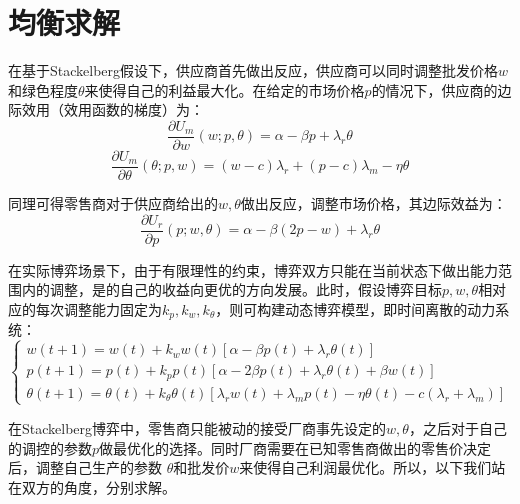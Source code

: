 \documentclass{article}
\begin{document}
\section{均衡求解}
\par 在基于Stackelberg假设下，供应商首先做出反应，供应商可以同时调整批发价格$w$和绿色程度$\theta$来使得自己的利益最大化。在给定的市场价格$p$的情况下，供应商的边际效用（效用函数的梯度）为：
\begin{equation}
    \frac{\partial U_m}{\partial w}(w;p,\theta)=\alpha-\beta p+\lambda_r\theta
\end{equation}
\begin{equation}
    \frac{\partial U_m}{\partial \theta}(\theta;p,w)=(w-c)\lambda_r+(p-c)\lambda_m-\eta\theta
\end{equation}
\par 同理可得零售商对于供应商给出的$w,\theta$做出反应，调整市场价格，其边际效益为：
\begin{equation}
    \frac{\partial U_r}{\partial p}(p;w,\theta)=\alpha-\beta (2p-w)+\lambda_r\theta
\end{equation}
\par 在实际博弈场景下，由于有限理性的约束，博弈双方只能在当前状态下做出能力范围内的调整，是的自己的收益向更优的方向发展。此时，假设博弈目标$p, w, \theta$相对应的每次调整能力固定为$k_p, k_w, k_\theta$，则可构建动态博弈模型，即时间离散的动力系统：
\begin{equation}  
    \left\{  
        \begin{array}{lr}
            w(t+1)=w(t)+k_ww(t)[\alpha-\beta p(t)+\lambda_r\theta(t)]               \\  
            p(t+1)=p(t)+k_pp(t)[\alpha-2\beta p(t)+\lambda_r\theta(t)+\beta w(t)]   \\  
            \theta(t+1)=\theta(t)+k_\theta\theta(t)[\lambda_rw(t)+\lambda_mp(t)-\eta\theta(t)-c(\lambda_r+\lambda_m)]
        \end{array}  
    \right.
\end{equation}  
\par 在Stackelberg博弈中，零售商只能被动的接受厂商事先设定的$w, \theta$，之后对于自己的调控的参数$p$做最优化的选择。同时厂商需要在已知零售商做出的零售价决定后，调整自己生产的参数 $\theta$和批发价$w$来使得自己利润最优化。所以，以下我们站在双方的角度，分别求解。
\end{document}
